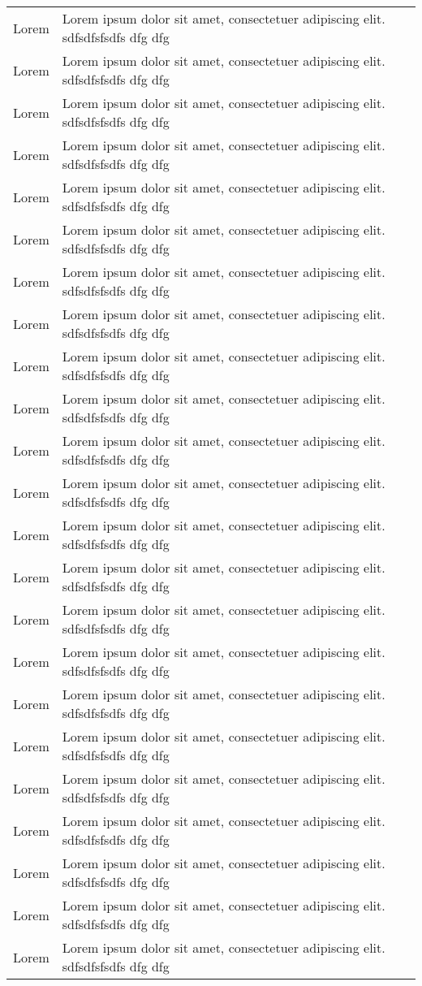 \begin{longtable}{|>{\footnotesize\setlength\hsize{.5\hsize}}X|>{\footnotesize\setlength\hsize{1.5\hsize}}X|}
Lorem & Lorem ipsum dolor sit amet, consectetuer adipiscing elit. sdfsdfsfsdfs dfg dfg\\
Lorem & Lorem ipsum dolor sit amet, consectetuer adipiscing elit. sdfsdfsfsdfs dfg dfg\\
Lorem & Lorem ipsum dolor sit amet, consectetuer adipiscing elit. sdfsdfsfsdfs dfg dfg\\
Lorem & Lorem ipsum dolor sit amet, consectetuer adipiscing elit. sdfsdfsfsdfs dfg dfg\\
Lorem & Lorem ipsum dolor sit amet, consectetuer adipiscing elit. sdfsdfsfsdfs dfg dfg\\
Lorem & Lorem ipsum dolor sit amet, consectetuer adipiscing elit. sdfsdfsfsdfs dfg dfg\\
Lorem & Lorem ipsum dolor sit amet, consectetuer adipiscing elit. sdfsdfsfsdfs dfg dfg\\
Lorem & Lorem ipsum dolor sit amet, consectetuer adipiscing elit. sdfsdfsfsdfs dfg dfg\\
Lorem & Lorem ipsum dolor sit amet, consectetuer adipiscing elit. sdfsdfsfsdfs dfg dfg\\
Lorem & Lorem ipsum dolor sit amet, consectetuer adipiscing elit. sdfsdfsfsdfs dfg dfg\\
Lorem & Lorem ipsum dolor sit amet, consectetuer adipiscing elit. sdfsdfsfsdfs dfg dfg\\
Lorem & Lorem ipsum dolor sit amet, consectetuer adipiscing elit. sdfsdfsfsdfs dfg dfg\\
Lorem & Lorem ipsum dolor sit amet, consectetuer adipiscing elit. sdfsdfsfsdfs dfg dfg\\
Lorem & Lorem ipsum dolor sit amet, consectetuer adipiscing elit. sdfsdfsfsdfs dfg dfg\\
Lorem & Lorem ipsum dolor sit amet, consectetuer adipiscing elit. sdfsdfsfsdfs dfg dfg\\
Lorem & Lorem ipsum dolor sit amet, consectetuer adipiscing elit. sdfsdfsfsdfs dfg dfg\\
Lorem & Lorem ipsum dolor sit amet, consectetuer adipiscing elit. sdfsdfsfsdfs dfg dfg\\
Lorem & Lorem ipsum dolor sit amet, consectetuer adipiscing elit. sdfsdfsfsdfs dfg dfg\\
Lorem & Lorem ipsum dolor sit amet, consectetuer adipiscing elit. sdfsdfsfsdfs dfg dfg\\
Lorem & Lorem ipsum dolor sit amet, consectetuer adipiscing elit. sdfsdfsfsdfs dfg dfg\\
Lorem & Lorem ipsum dolor sit amet, consectetuer adipiscing elit. sdfsdfsfsdfs dfg dfg\\
Lorem & Lorem ipsum dolor sit amet, consectetuer adipiscing elit. sdfsdfsfsdfs dfg dfg\\
Lorem & Lorem ipsum dolor sit amet, consectetuer adipiscing elit. sdfsdfsfsdfs dfg dfg\\
\hline
\end{longtable}
